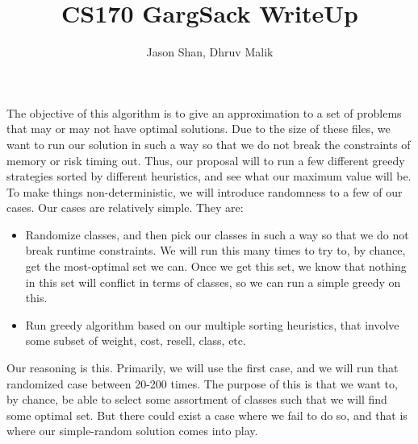 \documentclass[12pt]{article}
\title{%
CS170 GargSack WriteUp}
\author{Jason Shan, Dhruv Malik}
\begin{document}
\maketitle
\indent The objective of this algorithm is to give an approximation to a set of problems that may or may not have optimal solutions. Due to the size of these files, we want to run our solution in such a way so that we do not break the constraints of memory or risk timing out. Thus, our proposal will to run a few different greedy strategies sorted by different heuristics, and see what our maximum value will be. \\
\indent To make things non-deterministic, we will introduce randomness to a few of our cases. Our cases are relatively simple. They are:
\begin{itemize}
   \item Randomize classes, and then pick our classes in such a way so that we do not break runtime constraints. We will run this many times to try to, by chance, get the most-optimal set we can. Once we get this set, we know that nothing in this set will conflict in terms of classes, so we can run a simple greedy on this.
   \item Run greedy algorithm based on our multiple sorting heuristics, that involve some subset of weight, cost, resell, class, etc.
\end{itemize}
\indent Our reasoning is this. Primarily, we will use the first case, and we will run that randomized case between 20-200 times. The purpose of this is that we want to, by chance, be able to select some assortment of classes such that we will find some optimal set. But there could exist a case where we fail to do so, and that is where our simple-random solution comes into play. 
\end{document}
